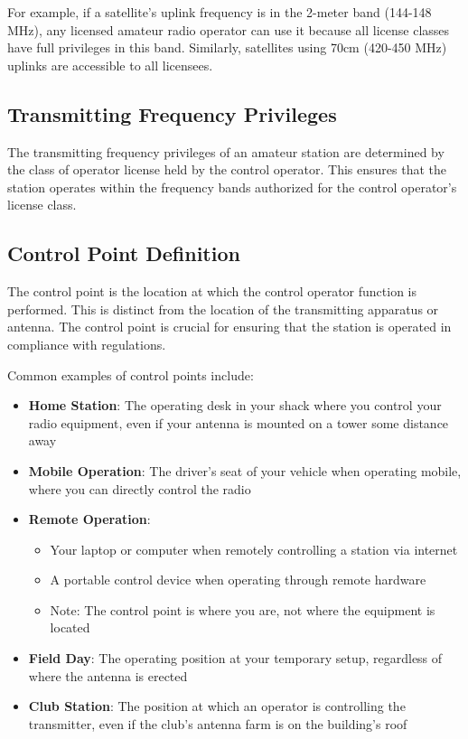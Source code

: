 For example, if a satellite's uplink frequency is in the 2-meter band (144-148 MHz), any licensed amateur radio operator can use it because all license classes have full privileges in this band. Similarly, satellites using 70cm (420-450 MHz) uplinks are accessible to all licensees.

\subsection*{Transmitting Frequency Privileges}
The transmitting frequency privileges of an amateur station are determined by the class of operator license held by the control operator. This ensures that the station operates within the frequency bands authorized for the control operator's license class.

\subsection*{Control Point Definition}
The control point is the location at which the control operator function is performed. This is distinct from the location of the transmitting apparatus or antenna. The control point is crucial for ensuring that the station is operated in compliance with regulations.

Common examples of control points include:
\begin{itemize}
    \item \textbf{Home Station}: The operating desk in your shack where you control your radio equipment, even if your antenna is mounted on a tower some distance away
    \item \textbf{Mobile Operation}: The driver's seat of your vehicle when operating mobile, where you can directly control the radio
    \item \textbf{Remote Operation}: 
        \begin{itemize}
            \item Your laptop or computer when remotely controlling a station via internet
            \item A portable control device when operating through remote hardware
            \item Note: The control point is where you are, not where the equipment is located
        \end{itemize}
    \item \textbf{Field Day}: The operating position at your temporary setup, regardless of where the antenna is erected
    \item \textbf{Club Station}: The position at which an operator is controlling the transmitter, even if the club's antenna farm is on the building's roof
\end{itemize}

